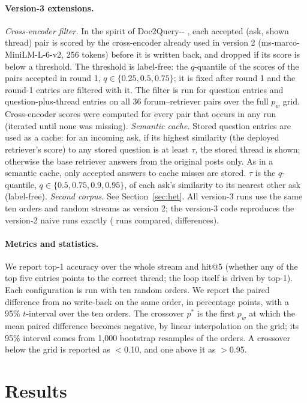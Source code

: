 \documentclass[11pt]{article}
\begin{document}
\paragraph{Version-3 extensions.} \emph{Cross-encoder filter.} In the spirit of Doc2Query-{}-{} \citep{gospodinov2023doc2queryminus}, each accepted (ask, shown thread) pair is scored by the cross-encoder already used in version 2 (ms-marco-MiniLM-L-6-v2, 256 tokens) before it is written back, and dropped if its score is below a threshold. The threshold is label-free: the $q$-quantile of the scores of the pairs accepted in round 1, $q\in\{0.25,0.5,0.75\}$; it is fixed after round 1 and the round-1 entries are filtered with it. The filter is run for question entries and question-plus-thread entries on all 36 forum--retriever pairs over the full $p_w$ grid. Cross-encoder scores were computed for every pair that occurs in any run (iterated until none was missing). \emph{Semantic cache.} Stored question entries are used as a cache: for an incoming ask, if its highest similarity (the deployed retriever's score) to any stored question is at least $\tau$, the stored thread is shown; otherwise the base retriever answers from the original posts only. As in a semantic cache, only accepted answers to cache misses are stored. $\tau$ is the $q$-quantile, $q\in\{0.5,0.75,0.9,0.95\}$, of each ask's similarity to its nearest other ask (label-free). \emph{Second corpus.} See Section~\ref{sec:het}. All version-3 runs use the same ten orders and random streams as version 2; the version-3 code reproduces the version-2 naive runs exactly (\vthreeSanityRuns{} runs compared, \vthreeSanityMis{} differences).

\paragraph{Metrics and statistics.} We report top-1 accuracy over the whole stream and hit@5 (whether any of the top five entries points to the correct thread; the loop itself is driven by top-1). Each configuration is run with ten random orders. We report the paired difference from no write-back on the same order, in percentage points, with a 95\% $t$-interval over the ten orders. The crossover $p^*$ is the first $p_w$ at which the mean paired difference becomes negative, by linear interpolation on the grid; its 95\% interval comes from 1{,}000 bootstrap resamples of the orders. A crossover below the grid is reported as $<$0.10, and one above it as $>$0.95.

\section{Results}
\label{sec:results}
\end{document}
